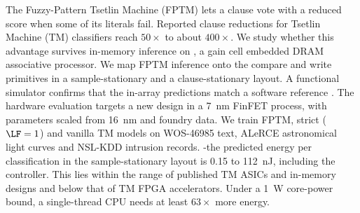 The Fuzzy-Pattern Tsetlin Machine (FPTM) lets a clause vote with a reduced score when some of its literals fail. Reported clause reductions for Tsetlin Machine (TM) classifiers reach $50\times$ to about $400\times$.
We study whether this advantage survives in-memory inference on \gainp{}, a gain cell embedded DRAM associative processor.
We map FPTM inference onto the \gainp{} compare and write primitives in a sample-stationary and a clause-stationary layout.
A functional simulator confirms that the in-array predictions match a software reference .
The hardware evaluation targets a new \gainp{} design in a 7~nm FinFET process, with parameters scaled from 16~nm \gainp{} and foundry data.
We train FPTM, strict ($\LF=1$) and vanilla TM models on WOS-46985 text, ALeRCE astronomical light curves and NSL-KDD intrusion records.
 \hyp{the predicted energy per classification in the sample-stationary layout is 0.15 to 112~nJ, including the controller. This lies within the range of published TM ASICs and in-memory designs and below that of TM FPGA accelerators. Under a 1~W core-power bound, a single-thread CPU needs at least $63\times$ more energy.}
